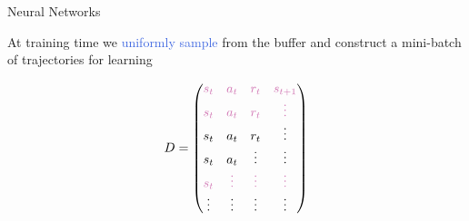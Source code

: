 \documentclass{beamer}
\begin{document}
\begin{frame}{Neural Networks}

	At training time we \textcolor{RoyalBlue}{uniformly sample} from the buffer and construct a \textcolor{skymagenta}{mini-batch} of trajectories for learning
	
	\begin{equation*}
		D = 
		\begin{pmatrix}
			\textcolor{skymagenta}{s_t} & \textcolor{skymagenta}{a_t} & \textcolor{skymagenta}{r_t} & \textcolor{skymagenta}{s_{t+1}} \\
			\textcolor{skymagenta}{s_t} & \textcolor{skymagenta}{a_t} & \textcolor{skymagenta}{r_t} & \textcolor{skymagenta}{\vdots} \\
			s_t & a_t & r_t & \vdots \\
			s_t & a_t & \vdots & \vdots \\
			\textcolor{skymagenta}{s_t} & \textcolor{skymagenta}{\vdots} & \textcolor{skymagenta}{\vdots} & \textcolor{skymagenta}{\vdots} \\
			\vdots & \vdots & \vdots & \vdots \\
		\end{pmatrix}
	\end{equation*}

\end{frame}
\end{document}
